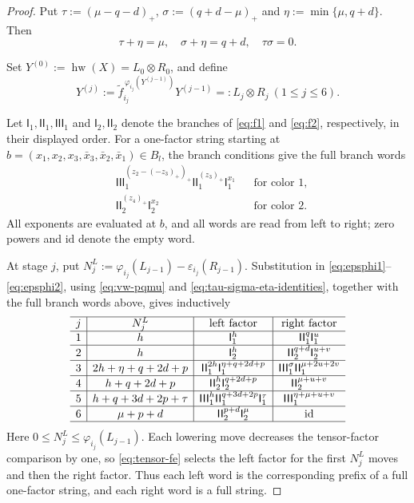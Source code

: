 \documentclass[11pt,reqno]{amsart}
\newcommand{\hw}{\operatorname{hw}}
\numberwithin{table}{section}
\numberwithin{equation}{section}
\theoremstyle{plain}
\theoremstyle{definition}
\begin{document}
\begin{proof}
	Put $\tau:=(\mu-q-d)_+$, $\sigma:=(q+d-\mu)_+$ and $\eta:=\min\{\mu,q+d\}$.
	Then
	\begin{equation}\label{eq:tau-sigma-eta-identities}
		\tau+\eta=\mu,
		\quad
		\sigma+\eta=q+d,
		\quad
		\tau\sigma=0.
	\end{equation}
	
	Set \(Y^{(0)}:=\hw(X)=L_0\otimes R_0\), and define
	\begin{equation}\label{eq:classical-lowering-recursion}
		Y^{(j)}
		:=
		\widetilde f_{i_j}^{
			\,\varphi_{i_j}(Y^{(j-1)})}
		Y^{(j-1)}
		=:L_j\otimes R_j
		\ (1\le j\le6).
	\end{equation}
	
	Let
	\(\mathsf I_1,\mathsf{II}_1,\mathsf{III}_1\) and
	\(\mathsf I_2,\mathsf{II}_2\) denote the branches of
	\eqref{eq:f1} and \eqref{eq:f2}, respectively, in their displayed
	order.
	For a one-factor string starting at
	\(b=(x_1,x_2,x_3,\bar x_3,\bar x_2,\bar x_1)\in B_l\),
	the branch conditions give the full branch words
	\[
	\begin{aligned}
		&\mathsf{III}_1^{(z_2-(-z_3)_+)_+}
		\mathsf{II}_1^{(z_3)_+}
		\mathsf I_1^{x_1}
		&&\text{for color }1,\\
		&\mathsf{II}_2^{(z_4)_+}
		\mathsf I_2^{x_2}
		&&\text{for color }2.
	\end{aligned}
	\]
	All exponents are evaluated at \(b\), and all words are read
	from left to right; zero powers and \(\mathrm{id}\) denote
	the empty word.
	
	At stage \(j\), put $N_j^L
	:=
	\varphi_{i_j}(L_{j-1})
	-
	\varepsilon_{i_j}(R_{j-1})$.
	Substitution in \eqref{eq:epsphi1}--\eqref{eq:epsphi2},
	using \eqref{eq:vw-pqmu} and
	\eqref{eq:tau-sigma-eta-identities}, together with the full
	branch words above, gives inductively
	\[
	\begin{array}{c|c|c|c}\hline
		j&N_j^L&\text{left factor}&\text{right factor}\\ \hline
		1&h&
		\mathsf I_1^h&
		\mathsf{II}_1^q\mathsf I_1^u\\ \hline
		2&h&
		\mathsf I_2^h&
		\mathsf{II}_2^{q+d}\mathsf I_2^{u+v}\\ \hline
		3&2h+\eta+q+2d+p&
		\mathsf{II}_1^{2h}
		\mathsf I_1^{\eta+q+2d+p}&
		\mathsf{III}_1^\sigma
		\mathsf{II}_1^{\mu+2u+2v}\\ \hline
		4&h+q+2d+p&
		\mathsf{II}_2^h
		\mathsf I_2^{q+2d+p}&
		\mathsf{II}_2^{\mu+u+v}\\ \hline
		5&h+q+3d+2p+\tau&
		\mathsf{III}_1^h
		\mathsf{II}_1^{q+3d+2p}
		\mathsf I_1^\tau&
		\mathsf{III}_1^{\eta+\mu+u+v}\\ \hline
		6&\mu+p+d&
		\mathsf{II}_2^{p+d}\mathsf I_2^\mu&
		\mathrm{id}\\ \hline
	\end{array}
	\]
	Here \(0\le N_j^L\le\varphi_{i_j}(L_{j-1})\).
	Each lowering move decreases the tensor-factor comparison by one,
	so \eqref{eq:tensor-fe} selects the left factor for the first
	\(N_j^L\) moves and then the right factor.
	Thus each left word is the corresponding prefix of a full
	one-factor string, and each right word is a full string.
	

\end{proof}
\end{document}
